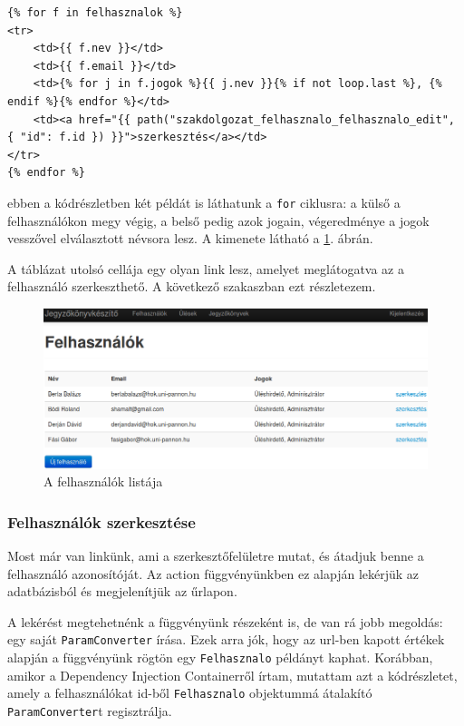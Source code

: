 \documentclass[a4paper,12pt,oneside]{report}
\begin{document}
\begin{lstlisting}
{% for f in felhasznalok %}
<tr>
    <td>{{ f.nev }}</td>
    <td>{{ f.email }}</td>
    <td>{% for j in f.jogok %}{{ j.nev }}{% if not loop.last %}, {% endif %}{% endfor %}</td>
    <td><a href="{{ path("szakdolgozat_felhasznalo_felhasznalo_edit", { "id": f.id }) }}">szerkesztés</a></td>
</tr>
{% endfor %}
\end{lstlisting}

ebben a kódrészletben két példát is láthatunk a {\tt for} ciklusra: a külső a felhasználókon megy végig, a belső pedig azok jogain, végeredménye a jogok vesszővel elválasztott névsora lesz. A kimenete látható a \ref{fig:felhasznalo_lista}. ábrán.

A táblázat utolsó cellája egy olyan link lesz, amelyet meglátogatva az a felhasználó szerkeszthető. A következő szakaszban ezt részletezem.

\begin{figure}[h]
    \includegraphics[width=\textwidth]{felhasznalo_lista.png}
    \caption{A felhasználók listája}
    \label{fig:felhasznalo_lista}
\end{figure}

\subsubsection*{Felhasználók szerkesztése}

Most már van linkünk, ami a szerkesztőfelületre mutat, és átadjuk benne a felhasználó azonosítóját. Az action függvényünkben ez alapján lekérjük az adatbázisból és megjelenítjük az űrlapon.

A lekérést megtehetnénk a függvényünk részeként is, de van rá jobb megoldás: egy saját {\tt ParamConverter} írása. Ezek arra jók, hogy az url-ben kapott értékek alapján a függvényünk rögtön egy {\tt Felhasznalo} példányt kaphat. Korábban, amikor a Dependency Injection Containerről írtam, mutattam azt a kódrészletet, amely a felhasználókat id-ből {\tt Felhasznalo} objektummá átalakító {\tt ParamConverter}t regisztrálja.
\end{document}
